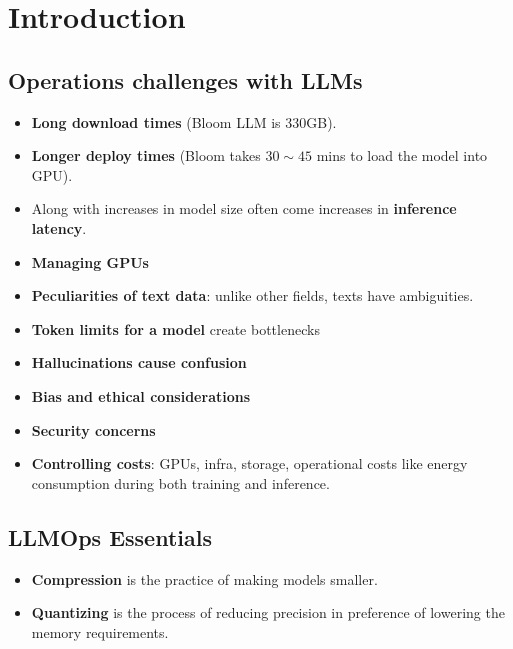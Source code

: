 \chapter{Introduction}

\section{Operations challenges with LLMs}
\begin{itemize}
	\item \textbf{Long download times} (\eg Bloom LLM is 330GB).
	\item \textbf{Longer deploy times} (\eg Bloom takes $30\sim 45$ mins to load the model into GPU).
	\item Along with increases in model size often come increases in \textbf{inference latency}. 
	\item \textbf{Managing GPUs}
	\item \textbf{Peculiarities of text data}: unlike other fields, texts have ambiguities. 
	\item \textbf{Token limits for a model} create bottlenecks
	\item \textbf{Hallucinations cause confusion} 
	\item \textbf{Bias and ethical considerations}
	\item \textbf{Security concerns}
	\item \textbf{Controlling costs}: \eg GPUs, infra, storage, operational costs like energy consumption during both training and inference. 
\end{itemize}

\section{LLMOps Essentials}

\begin{itemize}
	\item \textbf{Compression} is the practice of making models smaller. 
	\item \textbf{Quantizing} is the process of reducing precision in preference of lowering the memory requirements. 
\end{itemize}




